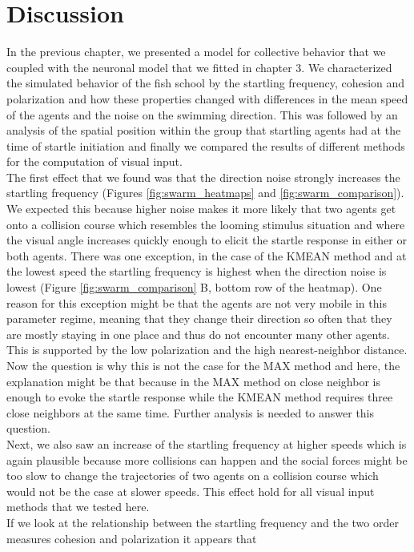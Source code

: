 \documentclass[a4paper,10pt,hidelinks]{scrreprt}
\begin{document}
	\chapter{Discussion}
    In the previous chapter, we presented a model for collective behavior that we coupled with the neuronal model that we fitted in chapter 3.
    We characterized the simulated behavior of the fish school by the startling frequency, cohesion and polarization and how these properties changed with differences in the mean speed of the agents and the noise on the swimming direction.
    This was followed by an analysis of the spatial position within the group that startling agents had at the time of startle initiation and finally we compared the results of different methods for the computation of visual input.\\
    The first effect that we found was that the direction noise strongly increases the startling frequency (Figures \ref{fig:swarm_heatmaps} and \ref{fig:swarm_comparison}).
    We expected this because higher noise makes it more likely that two agents get onto a collision course which resembles the looming stimulus situation and where the visual angle increases quickly enough to elicit the startle response in either or both agents.
    There was one exception, in the case of the KMEAN method and at the lowest speed the startling frequency is highest when the direction noise is lowest (Figure \ref{fig:swarm_comparison} B, bottom row of the heatmap).
    One reason for this exception might be that the agents are not very mobile in this parameter regime, meaning that they change their direction so often that they are mostly staying in one place and thus do not encounter many other agents.
    This is supported by the low polarization and the high nearest-neighbor distance.
    Now the question is why this is not the case for the MAX method and here, the explanation might be that because in the MAX method on close neighbor is enough to evoke the startle response while the KMEAN method requires three close neighbors at the same time.
    Further analysis is needed to answer this question.\\
    Next, we also saw an increase of the startling frequency at higher speeds which is again plausible because more collisions can happen and the social forces might be too slow to change the trajectories of two agents on a collision course which would not be the case at slower speeds.
    This effect hold for all visual input methods that we tested here.\\
    If we look at the relationship between the startling frequency and the two order measures cohesion and polarization it appears that 
\end{document}
